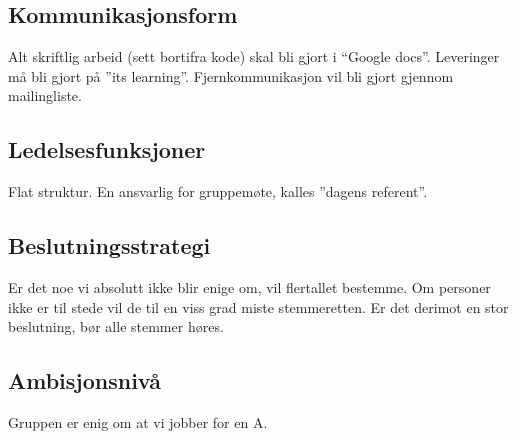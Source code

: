 \subsection{Kommunikasjonsform}
Alt skriftlig arbeid (sett bortifra kode) skal bli gjort i “Google docs”. Leveringer må bli gjort på ''its learning''. Fjernkommunikasjon vil bli gjort gjennom mailingliste.
\subsection{Ledelsesfunksjoner}
Flat struktur. En ansvarlig for gruppemøte, kalles ''dagens referent''.
\subsection{Beslutningsstrategi}
Er det noe vi absolutt ikke blir enige om, vil flertallet bestemme. Om personer ikke er til stede vil de til en viss grad miste stemmeretten. Er det derimot en stor beslutning, bør alle stemmer høres.
\subsection{Ambisjonsnivå}
Gruppen er enig om at vi jobber for en A.